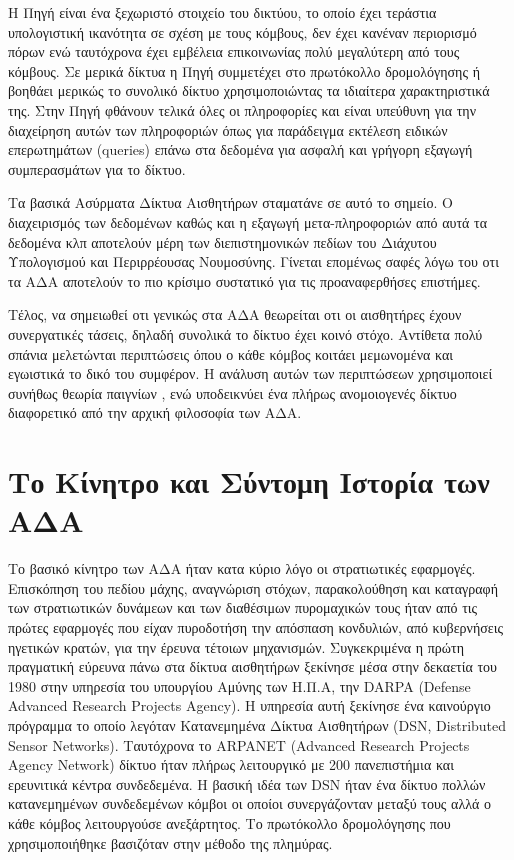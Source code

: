 Η Πηγή είναι ένα ξεχωριστό στοιχείο του δικτύου, το οποίο έχει τεράστια υπολογιστική ικανότητα σε σχέση με τους κόμβους, δεν έχει κανέναν περιορισμό πόρων ενώ
ταυτόχρονα έχει εμβέλεια επικοινωνίας
πολύ μεγαλύτερη από τους κόμβους.
Σε μερικά δίκτυα η Πηγή συμμετέχει στο πρωτόκολλο δρομολόγησης ή βοηθάει μερικώς το συνολικό δίκτυο χρησιμοποιώντας τα ιδιαίτερα χαρακτηριστικά της.
Στην Πηγή φθάνουν τελικά όλες οι πληροφορίες και είναι υπεύθυνη για την διαχείρηση αυτών των πληροφοριών όπως για παράδειγμα εκτέλεση ειδικών
επερωτημάτων (queries) επάνω στα δεδομένα για ασφαλή και γρήγορη εξαγωγή συμπερασμάτων για το δίκτυο.

Τα βασικά Ασύρματα Δίκτυα Αισθητήρων σταματάνε σε αυτό το σημείο.
Ο διαχειρισμός των δεδομένων καθώς και η εξαγωγή μετα-πληροφοριών από αυτά τα δεδομένα κλπ αποτελούν μέρη των διεπιστημονικών πεδίων του Διάχυτου Υπολογισμού και
Περιρρέουσας Νουμοσύνης.
Γίνεται επομένως σαφές λόγω του οτι τα ΑΔΑ αποτελούν το πιο κρίσιμο συστατικό για τις προαναφερθήσες επιστήμες.

Τέλος, να σημειωθεί οτι γενικώς στα ΑΔΑ θεωρείται οτι οι αισθητήρες έχουν συνεργατικές τάσεις, δηλαδή συνολικά το δίκτυο έχει κοινό στόχο.
Αντίθετα πολύ σπάνια μελετώνται περιπτώσεις όπου ο κάθε κόμβος κοιτάει μεμωνομένα και εγωιστικά το δικό του συμφέρον.
Η ανάλυση αυτών των περιπτώσεων χρησιμοποιεί συνήθως θεωρία παιγνίων \cite{game_theroy_sensor}, ενώ υποδεικνύει ένα πλήρως ανομοιογενές δίκτυο διαφορετικό από την
αρχική φιλοσοφία των ΑΔΑ.

\section{Το Κίνητρο και Σύντομη Ιστορία των ΑΔΑ} \label{sec:history}
Το βασικό κίνητρο των ΑΔΑ ήταν κατα κύριο λόγο οι στρατιωτικές εφαρμογές.
Επισκόπηση του πεδίου μάχης, αναγνώριση στόχων, παρακολούθηση και καταγραφή των στρατιωτικών δυνάμεων και των διαθέσιμων πυρομαχικών τους ήταν από τις πρώτες
εφαρμογές που είχαν πυροδοτήση την απόσπαση κονδυλιών, από κυβερνήσεις ηγετικών κρατών, για την έρευνα τέτοιων μηχανισμών.
Συγκεκριμένα η πρώτη πραγματική εύρευνα πάνω στα δίκτυα αισθητήρων ξεκίνησε μέσα στην δεκαετία του 1980 στην υπηρεσία του υπουργίου Αμύνης των Η.Π.Α, την DARPA
(Defense Advanced Research Projects Agency).
Η υπηρεσία αυτή ξεκίνησε ένα καινούργιο πρόγραμμα το οποίο λεγόταν Κατανεμημένα Δίκτυα Αισθητήρων (DSN, Distributed Sensor Networks).
Ταυτόχρονα το ARPANET (Advanced Research Projects Agency Network) δίκτυο ήταν πλήρως λειτουργικό με 200 πανεπιστήμια και ερευνιτικά κέντρα συνδεδεμένα.
Η βασική ιδέα των DSN ήταν ένα δίκτυο πολλών κατανεμημένων συνδεδεμένων κόμβοι οι οποίοι συνεργάζονταν μεταξύ τους αλλά ο κάθε κόμβος λειτουργούσε ανεξάρτητος.
Το πρωτόκολλο δρομολόγησης που χρησιμοποιήθηκε βασιζόταν στην μέθοδο της πλημύρας.


